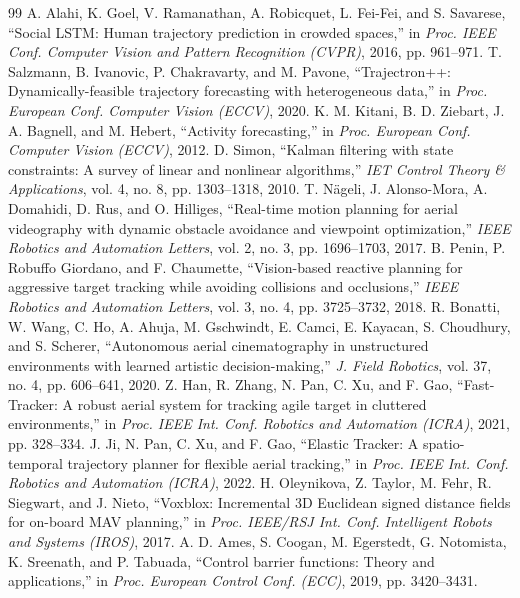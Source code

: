 \documentclass[12pt,a4paper]{article}
\begin{document}
\begin{thebibliography}{99}
 A. Alahi, K. Goel, V. Ramanathan, A. Robicquet, L. Fei-Fei, and S. Savarese, ``Social LSTM: Human trajectory prediction in crowded spaces,'' in \emph{Proc. IEEE Conf. Computer Vision and Pattern Recognition (CVPR)}, 2016, pp. 961–971.
 T. Salzmann, B. Ivanovic, P. Chakravarty, and M. Pavone, ``Trajectron++: Dynamically-feasible trajectory forecasting with heterogeneous data,'' in \emph{Proc. European Conf. Computer Vision (ECCV)}, 2020.
 K. M. Kitani, B. D. Ziebart, J. A. Bagnell, and M. Hebert, ``Activity forecasting,'' in \emph{Proc. European Conf. Computer Vision (ECCV)}, 2012.
 D. Simon, ``Kalman filtering with state constraints: A survey of linear and nonlinear algorithms,'' \emph{IET Control Theory \& Applications}, vol. 4, no. 8, pp. 1303–1318, 2010.
 T. Nägeli, J. Alonso-Mora, A. Domahidi, D. Rus, and O. Hilliges, ``Real-time motion planning for aerial videography with dynamic obstacle avoidance and viewpoint optimization,'' \emph{IEEE Robotics and Automation Letters}, vol. 2, no. 3, pp. 1696–1703, 2017.
 B. Penin, P. Robuffo Giordano, and F. Chaumette, ``Vision-based reactive planning for aggressive target tracking while avoiding collisions and occlusions,'' \emph{IEEE Robotics and Automation Letters}, vol. 3, no. 4, pp. 3725–3732, 2018.
 R. Bonatti, W. Wang, C. Ho, A. Ahuja, M. Gschwindt, E. Camci, E. Kayacan, S. Choudhury, and S. Scherer, ``Autonomous aerial cinematography in unstructured environments with learned artistic decision-making,'' \emph{J. Field Robotics}, vol. 37, no. 4, pp. 606–641, 2020.
 Z. Han, R. Zhang, N. Pan, C. Xu, and F. Gao, ``Fast-Tracker: A robust aerial system for tracking agile target in cluttered environments,'' in \emph{Proc. IEEE Int. Conf. Robotics and Automation (ICRA)}, 2021, pp. 328–334.
 J. Ji, N. Pan, C. Xu, and F. Gao, ``Elastic Tracker: A spatio-temporal trajectory planner for flexible aerial tracking,'' in \emph{Proc. IEEE Int. Conf. Robotics and Automation (ICRA)}, 2022.
 H. Oleynikova, Z. Taylor, M. Fehr, R. Siegwart, and J. Nieto, ``Voxblox: Incremental 3D Euclidean signed distance fields for on-board MAV planning,'' in \emph{Proc. IEEE/RSJ Int. Conf. Intelligent Robots and Systems (IROS)}, 2017.
 A. D. Ames, S. Coogan, M. Egerstedt, G. Notomista, K. Sreenath, and P. Tabuada, ``Control barrier functions: Theory and applications,'' in \emph{Proc. European Control Conf. (ECC)}, 2019, pp. 3420–3431.
\end{thebibliography}
\end{document}
